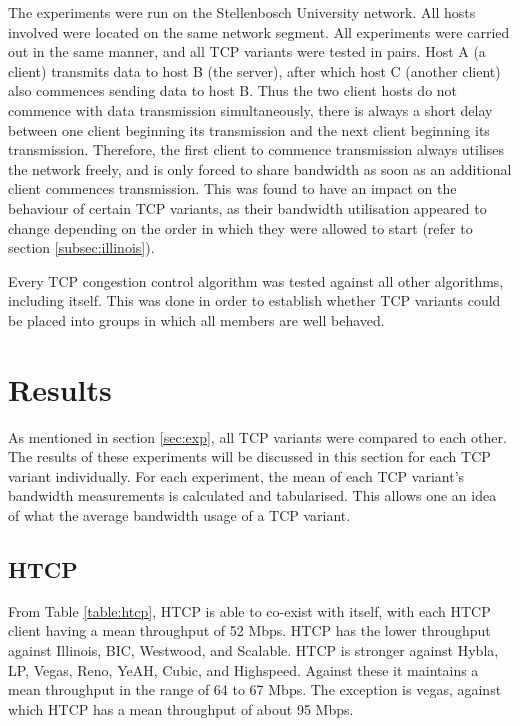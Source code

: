 \documentclass[11pt,a4paper,twocolumn]{article}
\begin{document}
The experiments were run on the Stellenbosch University network. All hosts involved were located on the same network segment. All experiments
were carried out in the same manner, and all TCP variants were tested in pairs. Host A (a client) transmits data to host B (the server), after which host C (another client) also commences
sending data to host B. Thus the two client hosts do not commence with data transmission simultaneously, there is always a short delay between
one client beginning its transmission and the next client beginning its transmission. Therefore, the first client to commence transmission
always utilises the network freely, and is only forced to share bandwidth as soon as an additional client commences transmission.
This was found to have an impact on the behaviour of certain TCP variants, as their bandwidth utilisation appeared to change depending
on the order in which they were allowed to start (refer to section \ref{subsec:illinois}).

Every TCP congestion control algorithm was tested against all other algorithms, including itself. This was done in order to establish whether TCP variants
could be placed into groups in which all members are well behaved.

\section{Results}
\label{sec:results}

As mentioned in section \ref{sec:exp}, all TCP variants were compared to each other. The results of these experiments will
be discussed in this section for each TCP variant individually. For each experiment, the mean of each TCP variant's bandwidth measurements
is calculated and tabularised. This allows one an idea of what the average bandwidth usage of a TCP variant.

\subsection{HTCP}
From Table \ref{table:htcp}, HTCP is able to co-exist with itself, with each HTCP client having a mean throughput of 52 Mbps. HTCP has the lower throughput against Illinois, BIC, Westwood, and Scalable. 
HTCP is stronger against Hybla, LP, Vegas, Reno, YeAH, Cubic, and Highspeed. Against these it maintains a mean throughput
in the range of 64 to 67 Mbps. The exception is vegas, against which HTCP has a mean throughput of about 95 Mbps.
\end{document}
